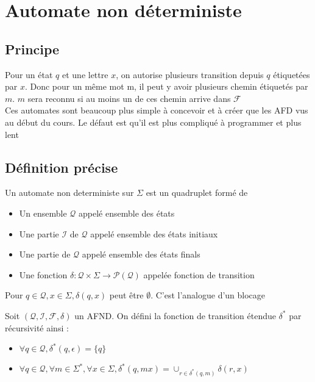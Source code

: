 \section{Automate non déterministe}
\subsection{Principe}

Pour un état $q$ et une lettre $x$, on autorise plusieurs transition depuis $q$ étiquetées par $x$.
Donc pour un même mot m, il peut y avoir plusieurs chemin étiquetés par $m$. $m$ sera reconnu si au moins un de ces
chemin arrive dans $\mathcal{F}$\\

Ces automates sont beaucoup plus simple à concevoir et à créer que les AFD vus au début du cours. Le défaut est qu'il est
plus compliqué à programmer et plus lent

\subsection{Définition précise}

\begin{definition}
    Un automate non deterministe sur $\Sigma$ est un quadruplet formé de
    \begin{itemize}
        \item Un ensemble $\mathcal{Q}$ appelé ensemble des états
        \item Une partie $\mathcal{I}$ de $\mathcal{Q}$ appelé ensemble des états initiaux
        \item Une partie de $\mathcal{Q}$ appelé ensemble des états finals
        \item Une fonction $\delta : \mathcal{Q}\times\Sigma \rightarrow \mathcal{P}(\mathcal{Q})$ appelée fonction de transition 
    \end{itemize}
\end{definition}

\begin{remark}
    Pour $q\in \mathcal{Q},x\in\Sigma, \delta(q,x)$ peut être $\emptyset$. C'est l'analogue d'un blocage 
\end{remark}

\begin{definition}
    Soit $(\mathcal{Q},\mathcal{I},\mathcal{F},\delta)$ un AFND. On défini la fonction de transition étendue $\delta^*$ 
    par récursivité ainsi :
    \begin{itemize}
        \item $\forall q \in \mathcal{Q}, \delta^*(q,\epsilon)=\{q\}$
        \item $\forall q \in \mathcal{Q}, \forall m \in \Sigma^*, \forall x \in \Sigma, \delta^*(q,mx)=\cup_{r\in \delta^*(q,m)}\delta(r,x)$
    \end{itemize}
\end{definition}

